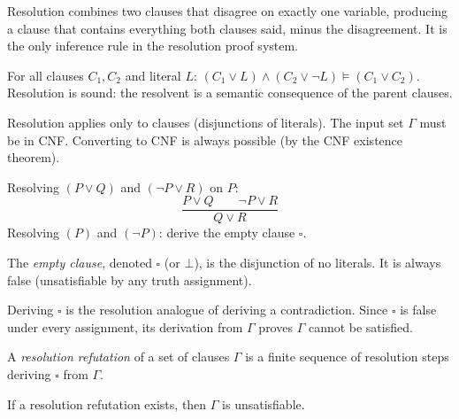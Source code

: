 \begin{remark}
Resolution combines two clauses that disagree on exactly one variable,
producing a clause that contains everything both clauses said, minus the
disagreement. It is the only inference rule in the resolution proof system.
\end{remark}

\begin{remark}
For all clauses $C_1, C_2$ and literal $L$:
$(C_1 \vee L) \wedge (C_2 \vee \neg L) \models (C_1 \vee C_2)$.
Resolution is sound: the resolvent is a semantic consequence of the parent clauses.
\end{remark}

\begin{remark}
Resolution applies only to clauses (disjunctions of literals). The input set
$\Gamma$ must be in CNF. Converting to CNF is always possible (by the CNF
existence theorem).
\end{remark}

\begin{example}
Resolving $(P \vee Q)$ and $(\neg P \vee R)$ on $P$:
\[
\frac{P \vee Q \qquad \neg P \vee R}{Q \vee R}
\]
Resolving $(P)$ and $(\neg P)$: derive the empty clause $\square$.
\end{example}

\begin{tcolorbox}[colback=propbox, colframe=propborder, arc=2pt,
  left=6pt, right=6pt, top=4pt, bottom=4pt,
  title={\small\textbf{Definition (Empty Clause)}},
  fonttitle=\small\bfseries]
\label{def:empty-clause}
The \emph{empty clause}, denoted $\square$ (or $\bot$), is the disjunction of
no literals. It is always false (unsatisfiable by any truth assignment).
\end{tcolorbox}

\begin{remark}[Intuition]
Deriving $\square$ is the resolution analogue of deriving a contradiction.
Since $\square$ is false under every assignment, its derivation from $\Gamma$
proves $\Gamma$ cannot be satisfied.
\end{remark}

\begin{tcolorbox}[colback=propbox, colframe=propborder, arc=2pt,
  left=6pt, right=6pt, top=4pt, bottom=4pt,
  title={\small\textbf{Definition (Resolution Refutation)}},
  fonttitle=\small\bfseries]
\label{def:refutation}
A \emph{resolution refutation} of a set of clauses $\Gamma$ is a finite
sequence of resolution steps deriving $\square$ from $\Gamma$.

If a resolution refutation exists, then $\Gamma$ is unsatisfiable.
\end{tcolorbox}

